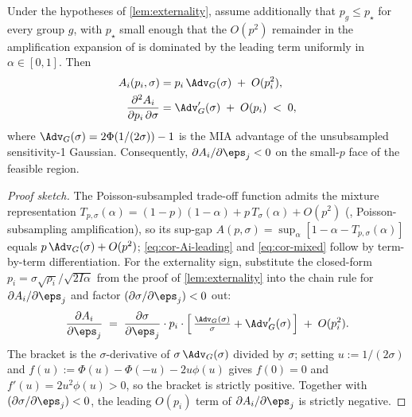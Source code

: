 \begin{corollary}
\label{cor:externality-small-p}
Under the hypotheses of \cref{lem:externality}, assume additionally that
$p_g \leq p_\star$ for every group $g$, with $p_\star$ small enough that
the $O(p^2)$ remainder in the amplification expansion of
\citet{balle2020privacy} is dominated by the leading term uniformly in
$\alpha \in [0,1]$. Then
\begin{align}
A_i(p_i,\sigma)
    &= p_i\, \Adv_G(\sigma) \;+\; O(p_i^2),
        \label{eq:cor-Ai-leading}\\
\frac{\partial^2 A_i}{\partial p_i\, \partial \sigma}
    &= \Adv_G'(\sigma) \;+\; O(p_i) \;<\; 0,
        \label{eq:cor-mixed}
\end{align}
where $\Adv_G(\sigma) = 2\Phi(1/(2\sigma))-1$ is the MIA advantage of the
unsubsampled sensitivity-1 Gaussian. Consequently,
$\partial A_i / \partial \eps_j < 0$ on the small-$p$ face of the
feasible region.
\end{corollary}

\begin{proof}[Proof sketch]
The Poisson-subsampled trade-off function admits the mixture representation
$T_{p,\sigma}(\alpha) = (1-p)(1-\alpha) + p\, T_\sigma(\alpha) + O(p^2)$
(\cite{balle2020privacy}, Poisson-subsampling amplification), so its
sup-gap $A(p,\sigma) = \sup_\alpha[1-\alpha-T_{p,\sigma}(\alpha)]$ equals
$p\,\Adv_G(\sigma) + O(p^2)$; \eqref{eq:cor-Ai-leading} and
\eqref{eq:cor-mixed} follow by term-by-term differentiation. For the
externality sign, substitute the closed-form $p_i = \sigma\sqrt{\rho_i}/
\sqrt{2I\alpha}$ from the proof of \cref{lem:externality} into the chain
rule for $\partial A_i/\partial\eps_j$ and factor
$(\partial\sigma/\partial\eps_j)<0$ out:
\begin{equation}
\frac{\partial A_i}{\partial \eps_j}
   \;=\; \frac{\partial \sigma}{\partial \eps_j}
        \cdot p_i \cdot
        \Bigl[\, \tfrac{\Adv_G(\sigma)}{\sigma}
              + \Adv_G'(\sigma)\, \Bigr] \;+\; O(p_i^2).
\label{eq:proof-bracket}
\end{equation}
The bracket is the $\sigma$-derivative of $\sigma\,\Adv_G(\sigma)$
divided by $\sigma$; setting $u := 1/(2\sigma)$ and
$f(u) := \Phi(u) - \Phi(-u) - 2u\phi(u)$ gives $f(0)=0$ and
$f'(u) = 2u^2\phi(u) > 0$, so the bracket is strictly positive. Together
with $(\partial\sigma/\partial\eps_j)<0$, the leading $O(p_i)$ term of
$\partial A_i/\partial\eps_j$ is strictly negative.
\end{proof}

